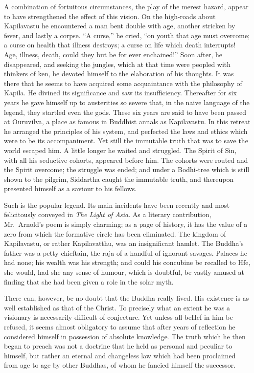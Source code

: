 \documentclass[]{book}
\begin{document}
A combination of fortuitous circumstances, the play of the merest
hazard, appear to have strengthened the effect of this vision. On the
high-roads about Kapilavastu he encountered a man bent double with age,
another stricken by fever, and lastly a corpse. ``A curse,'' he cried,
``on youth that age must overcome; a curse on health that illness
destroys; a curse on life which death interrupts! Age, illness, death,
could they but be for ever enchained!'' Soon after, he disappeared, and
seeking the jungles, which at that time were peopled with thinkers of
ken, he devoted himself to the elaboration of his thoughts. It was there
that he seems to have acquired some acquaintance with the philosophy of
Kapila. He divined its significance and saw its insufficiency.
Thereafter for six years he gave himself up to austerities so severe
that, in the naive language of the legend, they startled even the gods.
These six years are said to have been passed at Ouruvilva, a place as
famous in Buddhist annals as Kapilavastu. In this retreat he arranged
the principles of his system, and perfected the laws and ethics which
were to be its accompaniment. Yet still the immutable truth that was to
save the world escaped him. A little longer he waited and struggled. The
Spirit of Sin, with all his seductive cohorts, appeared before him. The
cohorts were routed and the Spirit overcome; the struggle was ended; and
under a Bodhi-tree which is still shown to the pilgrim, Siddartha caught
the immutable truth, and thereupon presented himself as a saviour to his
fellows.

Such is the popular legend. Its main incidents have been recently and
most felicitously conveyed in \emph{The Light of Asia}. As a literary
contribution, Mr.~Arnold's poem is simply charming; as a page of
history, it has the value of a zero from which the formative circle has
been eliminated. The kingdom of Kapilavastu, or rather Kapilavatthu, was
an insignificant hamlet. The Buddha's father was a petty chieftain, the
raja of a handful of ignorant savages. Palaces he had none; his wealth
was his strength; and could his concubine be recalled to Hfe, she would,
had she any sense of humour, which is doubtful, be vastly amused at
finding that she had been given a role in the solar myth.

There can, however, be no doubt that the Buddha really lived. His
existence is as well established as that of the Christ. To precisely
what an extent he was a visionary is necessarily difficult of
conjecture. Yet unless all beHef in him be refused, it seems almost
obligatory to assume that after years of reflection he considered
himself in possession of absolute knowledge. The truth which he then
began to preach was not a doctrine that he held as personal and peculiar
to himself, but rather an eternal and changeless law which had been
proclaimed from age to age by other Buddhas, of whom he fancied himself
the successor.
\end{document}
